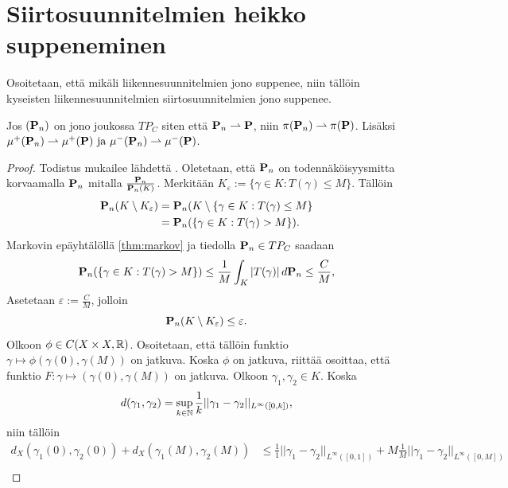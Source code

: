 \documentclass[12pt,oneside,a4paper]{amsbook} %
\begin{document}
\section{Siirtosuunnitelmien heikko suppeneminen}

Osoitetaan, että mikäli liikennesuunnitelmien jono suppenee, niin tällöin kyseisten liikennesuunnitelmien siirtosuunnitelmien jono suppenee.

\begin{theorem}\label{le:tfPlanWeakConv}
    Jos $(\P_n)$ on jono joukossa $TP_C$ siten että $\P_n \rightharpoonup \P$, niin $\pi(\P_n) \rightharpoonup \pi(\P)$. Lisäksi $\mu^+(\P_n) \rightharpoonup \mu^+(\P) \text{ ja }  \mu^-(\P_n) \rightharpoonup \mu^-(\P)$.
    
\end{theorem}
\begin{proof}
    Todistus mukailee lähdettä \cite[s. 33]{optimal}. Oletetaan, että $\P_n$ on todennäköisyysmitta korvaamalla $\P_n$ mitalla $\frac{\P_n}{\P_n(K)}$. Merkitään $K_\varepsilon := \{\gamma \in K : T(\gamma) \le M\}$. Tällöin
    \begin{align*}
        \P_n(K\setminus K_\varepsilon) &= \P_n(K\setminus\{\gamma \in K: T(\gamma) \le M\} \\
        &= \P_n(\{\gamma \in K : T(\gamma) > M\}).
    \end{align*}
    Markovin epäyhtälöllä \ref{thm:markov} ja tiedolla $\P_n \in TP_C$ saadaan 
    \begin{equation*}
        \P_n(\{\gamma \in K : T(\gamma) > M\}) \le \frac{1}{M}\int_K |T(\gamma)| \, d\P_n \le \frac{C}{M},
    \end{equation*}
    Asetetaan $\varepsilon := \frac{C}{M}$, jolloin
    \begin{equation*}
        \P_n(K\setminus K_\varepsilon) \le \varepsilon.
    \end{equation*}
    Olkoon $\phi \in C(X\times X, \R)$. Osoitetaan, että tällöin funktio $\gamma \mapsto \phi(\gamma(0), \gamma(M))$ on jatkuva. Koska $\phi$ on jatkuva, riittää osoittaa, että funktio $F: \gamma \mapsto (\gamma(0), \gamma(M))$ on jatkuva. Olkoon $\gamma_1, \gamma_2 \in K$. Koska
    \begin{equation*}
        d(\gamma_1, \gamma_2) = \sup_{k\in\N} \frac{1}{k}||\gamma_1-\gamma_2||_{L^\infty([0,k])},
    \end{equation*}
    niin tällöin
    \begin{align*}
        d_X(\gamma_1(0), \gamma_2(0)) + d_X(\gamma_1(M), \gamma_2(M)) &\le \frac{1}{1}||\gamma_1-\gamma_2||_{L^\infty([0,1])} + M\frac{1}{M}||\gamma_1-\gamma_2||_{L^\infty([0,M])} \\

\end{align*}
\end{proof}
\end{document}
